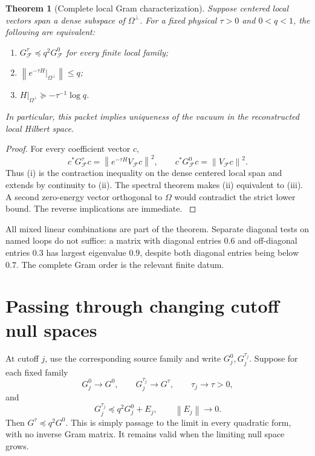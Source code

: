 \documentclass[11pt,oneside,openany]{book}
\newtheorem{theorem}{Theorem}[chapter]
\theoremstyle{definition}
\theoremstyle{remark}
\newcommand{\norm}[1]{\left\lVert#1\right\rVert}
\newcommand{\src}[2]{\cite[#2]{#1}}
\begin{document}
\begin{theorem}[Complete local Gram characterization]\label{thm:local-Gram}
Suppose centered local vectors span a dense subspace of $\Omega^\perp$. For a fixed physical $\tau>0$ and $0<q<1$, the following are equivalent:
\begin{enumerate}[label=\textup{(\roman*)},leftmargin=2.5em]
\item $G_{\mathcal F}^{\tau}\preceq q^2G_{\mathcal F}^{0}$ for every finite local family;
\item $\norm{e^{-\tau H}|_{\Omega^\perp}}\le q$;
\item $H|_{\Omega^\perp}\succeq-\tau^{-1}\log q$.
\end{enumerate}
In particular, this packet implies uniqueness of the vacuum in the reconstructed local Hilbert space.
\end{theorem}
\begin{proof}
For every coefficient vector $c$,
\[
c^*G_{\mathcal F}^{\tau}c
=\norm{e^{-\tau H}V_{\mathcal F}c}^2,
\qquad c^*G_{\mathcal F}^{0}c=\norm{V_{\mathcal F}c}^2.
\]
Thus (i) is the contraction inequality on the dense centered local span and extends by continuity to (ii). The spectral theorem makes (ii) equivalent to (iii). A second zero-energy vector orthogonal to $\Omega$ would contradict the strict lower bound. The reverse implications are immediate. \src{F1}{V1}
\end{proof}

All mixed linear combinations are part of the theorem. Separate diagonal tests on named loops do not suffice: a matrix with diagonal entries $0.6$ and off-diagonal entries $0.3$ has largest eigenvalue $0.9$, despite both diagonal entries being below $0.7$. The complete Gram order is the relevant finite datum.

\section{Passing through changing cutoff null spaces}
At cutoff $j$, use the corresponding source family and write $G_j^0,G_j^{\tau_j}$. Suppose for each fixed family
\begin{equation}\label{eq:Gram-convergence}
G_j^0\to G^0,\qquad G_j^{\tau_j}\to G^\tau,
\qquad \tau_j\to\tau>0,
\end{equation}
and
\begin{equation}\label{eq:Gram-error}
G_j^{\tau_j}\preceq q^2G_j^0+E_j,\qquad \norm{E_j}\to0.
\end{equation}
Then $G^\tau\preceq q^2G^0$. This is simply passage to the limit in every quadratic form, with no inverse Gram matrix. It remains valid when the limiting null space grows.
\end{document}
